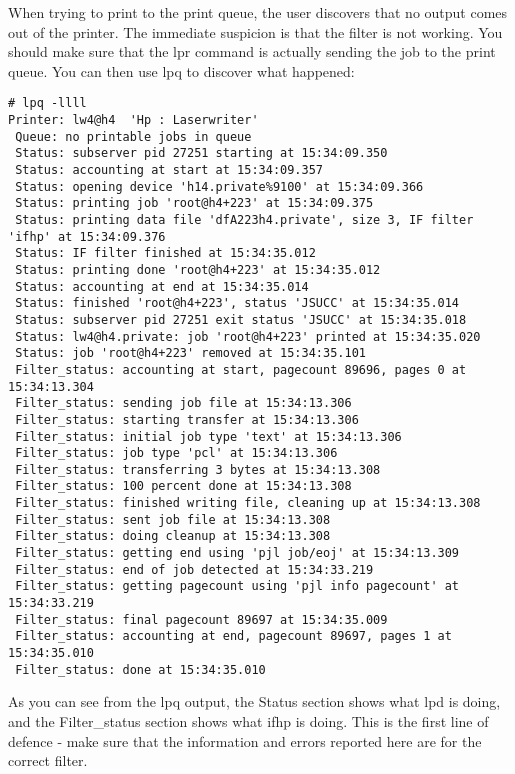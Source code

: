 \documentclass[a4paper]{article}
\begin{document}
When trying to print to the print queue,
the user discovers that no output comes out of the printer.
The immediate suspicion is that the filter is not working.
You should make sure that the {\ttfamily lpr} command is actually sending
the job to the print queue.
You can then use {\ttfamily lpq} to discover what happened:
\begin{tscreen}
\begin{verbatim}
# lpq -llll
Printer: lw4@h4  'Hp : Laserwriter'
 Queue: no printable jobs in queue
 Status: subserver pid 27251 starting at 15:34:09.350
 Status: accounting at start at 15:34:09.357
 Status: opening device 'h14.private%9100' at 15:34:09.366
 Status: printing job 'root@h4+223' at 15:34:09.375
 Status: printing data file 'dfA223h4.private', size 3, IF filter 'ifhp' at 15:34:09.376
 Status: IF filter finished at 15:34:35.012
 Status: printing done 'root@h4+223' at 15:34:35.012
 Status: accounting at end at 15:34:35.014
 Status: finished 'root@h4+223', status 'JSUCC' at 15:34:35.014
 Status: subserver pid 27251 exit status 'JSUCC' at 15:34:35.018
 Status: lw4@h4.private: job 'root@h4+223' printed at 15:34:35.020
 Status: job 'root@h4+223' removed at 15:34:35.101
 Filter_status: accounting at start, pagecount 89696, pages 0 at 15:34:13.304
 Filter_status: sending job file at 15:34:13.306
 Filter_status: starting transfer at 15:34:13.306
 Filter_status: initial job type 'text' at 15:34:13.306
 Filter_status: job type 'pcl' at 15:34:13.306
 Filter_status: transferring 3 bytes at 15:34:13.308
 Filter_status: 100 percent done at 15:34:13.308
 Filter_status: finished writing file, cleaning up at 15:34:13.308
 Filter_status: sent job file at 15:34:13.308
 Filter_status: doing cleanup at 15:34:13.308
 Filter_status: getting end using 'pjl job/eoj' at 15:34:13.309
 Filter_status: end of job detected at 15:34:33.219
 Filter_status: getting pagecount using 'pjl info pagecount' at 15:34:33.219
 Filter_status: final pagecount 89697 at 15:34:35.009
 Filter_status: accounting at end, pagecount 89697, pages 1 at 15:34:35.010
 Filter_status: done at 15:34:35.010
\end{verbatim}
\end{tscreen}


As you can see from the {\ttfamily lpq} output,
the {\ttfamily Status} section shows what {\ttfamily lpd} is doing,
and the {\ttfamily Filter\_status} section shows what {\ttfamily ifhp}
is doing.
This is the first line of defence - make sure that the information
and errors reported here are for the correct filter.
\end{document}
